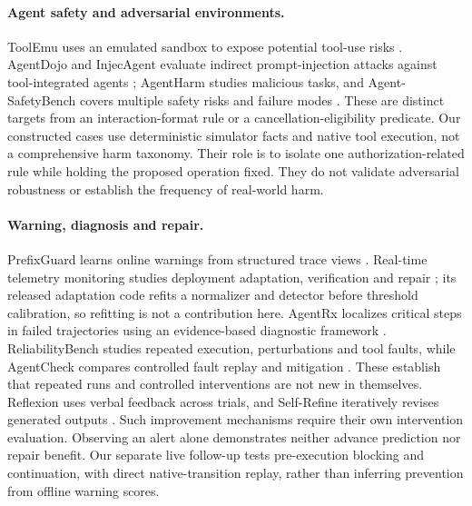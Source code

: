 \documentclass[10pt]{article}
\begin{document}
\paragraph{Agent safety and adversarial environments.}
ToolEmu uses an emulated sandbox to expose potential tool-use risks \citep{ruan2023toolemu}. AgentDojo and InjecAgent evaluate indirect prompt-injection attacks against tool-integrated agents \citep{debenedetti2024agentdojo,zhan2024injecagent}; AgentHarm studies malicious tasks, and Agent-SafetyBench covers multiple safety risks and failure modes \citep{andriushchenko2024agentharm,zhang2024agentsafety}. These are distinct targets from an interaction-format rule or a cancellation-eligibility predicate. Our constructed cases use deterministic simulator facts and native tool execution, not a comprehensive harm taxonomy. Their role is to isolate one authorization-related rule while holding the proposed operation fixed. They do not validate adversarial robustness or establish the frequency of real-world harm.

\paragraph{Warning, diagnosis and repair.}
PrefixGuard learns online warnings from structured trace views \citep{huang2026prefix}. Real-time telemetry monitoring studies deployment adaptation, verification and repair \citep{dubey2026monitor}; its released adaptation code refits a normalizer and detector before threshold calibration, so refitting is not a contribution here. AgentRx localizes critical steps in failed trajectories using an evidence-based diagnostic framework \citep{barke2026agentrx}. ReliabilityBench studies repeated execution, perturbations and tool faults, while AgentCheck compares controlled fault replay and mitigation \citep{reliability2026,mazumder2026agentcheck}. These establish that repeated runs and controlled interventions are not new in themselves. Reflexion uses verbal feedback across trials, and Self-Refine iteratively revises generated outputs \citep{shinn2023reflexion,madaan2023selfrefine}. Such improvement mechanisms require their own intervention evaluation. Observing an alert alone demonstrates neither advance prediction nor repair benefit. Our separate live follow-up tests pre-execution blocking and continuation, with direct native-transition replay, rather than inferring prevention from offline warning scores.
\end{document}
